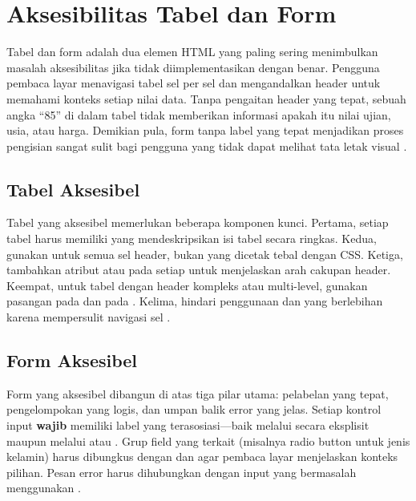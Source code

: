 \section{Aksesibilitas Tabel dan Form}

Tabel dan form adalah dua elemen HTML yang paling sering menimbulkan masalah aksesibilitas jika tidak diimplementasikan dengan benar. Pengguna pembaca layar menavigasi tabel sel per sel dan mengandalkan header untuk memahami konteks setiap nilai data. Tanpa pengaitan header yang tepat, sebuah angka ``85'' di dalam tabel tidak memberikan informasi apakah itu nilai ujian, usia, atau harga. Demikian pula, form tanpa label yang tepat menjadikan proses pengisian sangat sulit bagi pengguna yang tidak dapat melihat tata letak visual \cite{mdnAccessibility}.

\subsection{Tabel Aksesibel}

Tabel yang aksesibel memerlukan beberapa komponen kunci. Pertama, setiap tabel harus memiliki  yang mendeskripsikan isi tabel secara ringkas. Kedua, gunakan  untuk semua sel header, bukan  yang dicetak tebal dengan CSS. Ketiga, tambahkan atribut  atau  pada setiap  untuk menjelaskan arah cakupan header. Keempat, untuk tabel dengan header kompleks atau multi-level, gunakan pasangan  pada  dan  pada . Kelima, hindari penggunaan  dan  yang berlebihan karena mempersulit navigasi sel \cite{webdevAccessibility}.

\subsection{Form Aksesibel}

Form yang aksesibel dibangun di atas tiga pilar utama: pelabelan yang tepat, pengelompokan yang logis, dan umpan balik error yang jelas. Setiap kontrol input \textbf{wajib} memiliki label yang terasosiasi---baik melalui  secara eksplisit maupun melalui  atau . Grup field yang terkait (misalnya radio button untuk jenis kelamin) harus dibungkus dengan  dan  agar pembaca layar menjelaskan konteks pilihan. Pesan error harus dihubungkan dengan input yang bermasalah menggunakan  \cite{mdnAccessibility}.

